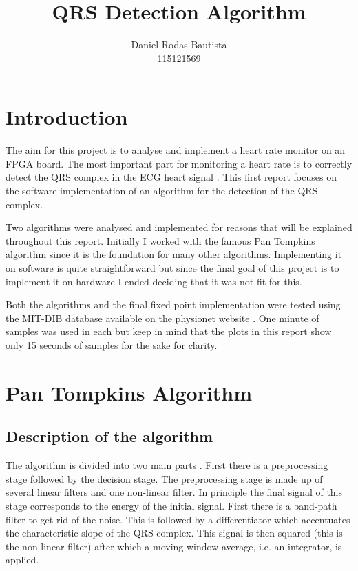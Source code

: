 \documentclass{article}
\title{QRS Detection Algorithm}
\author{Daniel Rodas Bautista\\
115121569}
\begin{document}
\maketitle

\section{Introduction}
The aim for this project is to analyse and implement a heart rate monitor on an FPGA board. The most important part for monitoring a heart rate is to correctly detect the QRS complex in the ECG heart signal \cite{principles}. This first report focuses on the software implementation of an algorithm for the detection of the QRS complex. 

Two algorithms were analysed and implemented for reasons that will be explained throughout this report. Initially I worked with the famous Pan Tompkins algorithm since it is the foundation for many other algorithms. Implementing it on software is quite straightforward but since the final goal of this project is to implement it on hardware I ended deciding that it was not fit for this. 

Both the algorithms and the final fixed point implementation were tested using the MIT-DIB database \cite{mit} available on the physionet website \cite{physionet}. One minute of samples was used in each but keep in mind that the plots in this report show only 15 seconds of samples for the sake for clarity.

\section{Pan Tompkins Algorithm}

\subsection{Description of the algorithm}

The algorithm is divided into two main parts \cite{pan}. First there is a preprocessing stage followed by the decision stage. The preprocessing stage is made up of several linear filters and one non-linear filter. In principle the final signal of this stage corresponds to the energy of the initial signal. First there is a band-path filter to get rid of the noise. This is followed by a differentiator which accentuates the characteristic  slope of the QRS complex. This signal is then squared (this is the non-linear filter) after which a moving window average, i.e. an integrator, is applied. 
\end{document}
